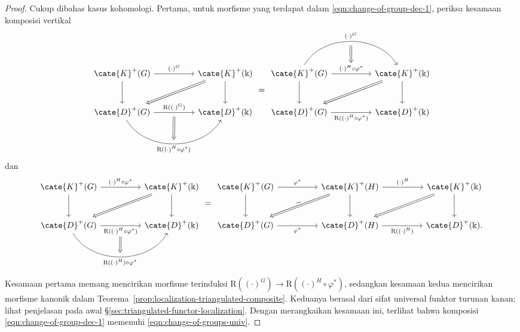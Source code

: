 \begin{proof}
	Cukup dibahas kasus kohomologi. Pertama, untuk morfisme yang terdapat dalam
	\eqref{eqn:change-of-group-dec-1}, periksa kesamaan komposisi vertikal
	\[\begin{tikzcd}[column sep=huge, row sep=large]
		\cate{K}^+(G) \arrow[r, "{(\cdot)^G}"] \arrow[d] & \cate{K}^+(\Bbbk) \arrow[d] \arrow[Rightarrow, ld] \\
		\cate{D}^+(G) \arrow[r, "{\mathrm{R}((\cdot)^G)}", ""' {name=D}] \arrow[r, bend right=60, "" {name=U}, "{\mathrm{R}((\cdot)^H \circ \varphi^*)}"'] & \cate{D}^+(\Bbbk) \arrow[Rightarrow, from=D, to=U]
	\end{tikzcd} = \begin{tikzcd}[column sep=huge, row sep=large]
		\cate{K}^+(G) \arrow[r, "{(\cdot)^H \circ \varphi^*}" {name=D}] \arrow[d] \arrow[r, bend left=60, ""' {name=U}, "{(\cdot)^G}"] & \cate{K}^+(\Bbbk) \arrow[d] \arrow[Rightarrow, ld] \\
		\cate{D}^+(G) \arrow[r, "{\mathrm{R}((\cdot)^H \circ \varphi^* ) }"'] & \cate{D}^+(\Bbbk) \arrow[Rightarrow, from=U, to=D]
	\end{tikzcd}\]
dan
	\[\begin{tikzcd}[column sep=huge, row sep=large]
		\cate{K}^+(G) \arrow[r, "{(\cdot)^H \circ \varphi^*}"] \arrow[d] & \cate{K}^+(\Bbbk) \arrow[d] \arrow[Rightarrow, ld] \\
		\cate{D}^+(G) \arrow[r, "{\mathrm{R}((\cdot)^H \circ \varphi^* ) }"' {name=U}] \arrow[r, bend right=60, "{\mathrm{R}((\cdot)^H) \circ \varphi^*}"', "" {name=D}] & \cate{D}^+(\Bbbk) \arrow[Rightarrow, from=U, to=D]
	\end{tikzcd} = \begin{tikzcd}[column sep=huge, row sep=large]
		\cate{K}^+(G) \arrow[d] \arrow[r, "{\varphi^*}"] & \cate{K}^+(H) \arrow[d] \arrow[r, "{(\cdot)^H}"] \arrow[Rightarrow, ld, "\sim" sloped] & \cate{K}^+(\Bbbk) \arrow[d] \arrow[Rightarrow, ld] \\
		\cate{D}^+(G) \arrow[r, "{\varphi^*}"'] & \cate{D}^+(H) \arrow[r, "{\mathrm{R}((\cdot)^H)}"'] & \cate{D}^+(\Bbbk).
	\end{tikzcd}\]

	Kesamaan pertama memang mencirikan morfisme terinduksi
	$\mathrm{R}((\cdot)^G)\to
	\mathrm{R}((\cdot)^H\circ\varphi^*)$, sedangkan kesamaan kedua mencirikan
	morfisme kanonik dalam
	Teorema~\ref{prop:localization-triangulated-composite}. Keduanya berasal dari
	sifat universal funktor turunan kanan; lihat penjelasan pada awal
	\S\ref{sec:triangulated-functor-localization}. Dengan merangkaikan kesamaan
	ini, terlihat bahwa komposisi \eqref{eqn:change-of-group-dec-1} memenuhi
	\eqref{eqn:change-of-groups-univ}.
\end{proof}

